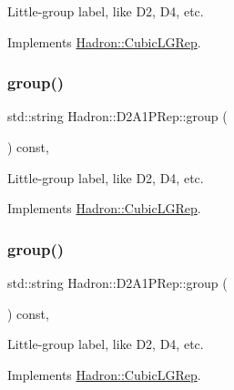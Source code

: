 Little-\/group label, like D2, D4, etc. 

Implements \mbox{\hyperlink{structHadron_1_1CubicLGRep_a9bdb14b519a611d21379ed96a3a9eb41}{Hadron\+::\+Cubic\+L\+G\+Rep}}.

\mbox{\label{structHadron_1_1D2A1PRep_a202c6828bea0a6048053c70ddf7ea474}} 
\subsubsection{\texorpdfstring{group()}{group()}\hspace{0.1cm}{\footnotesize\ttfamily [2/3]}}
{\footnotesize\ttfamily std\+::string Hadron\+::\+D2\+A1\+P\+Rep\+::group (\begin{DoxyParamCaption}{ }\end{DoxyParamCaption}) const\hspace{0.3cm}{\ttfamily [inline]}, {\ttfamily [virtual]}}

Little-\/group label, like D2, D4, etc. 

Implements \mbox{\hyperlink{structHadron_1_1CubicLGRep_a9bdb14b519a611d21379ed96a3a9eb41}{Hadron\+::\+Cubic\+L\+G\+Rep}}.

\mbox{\label{structHadron_1_1D2A1PRep_a202c6828bea0a6048053c70ddf7ea474}} 
\subsubsection{\texorpdfstring{group()}{group()}\hspace{0.1cm}{\footnotesize\ttfamily [3/3]}}
{\footnotesize\ttfamily std\+::string Hadron\+::\+D2\+A1\+P\+Rep\+::group (\begin{DoxyParamCaption}{ }\end{DoxyParamCaption}) const\hspace{0.3cm}{\ttfamily [inline]}, {\ttfamily [virtual]}}

Little-\/group label, like D2, D4, etc. 

Implements \mbox{\hyperlink{structHadron_1_1CubicLGRep_a9bdb14b519a611d21379ed96a3a9eb41}{Hadron\+::\+Cubic\+L\+G\+Rep}}.

\mbox{\label{structHadron_1_1D2A1PRep_a127d5b4fc80ab71a7b8f3356713d4976}} 
